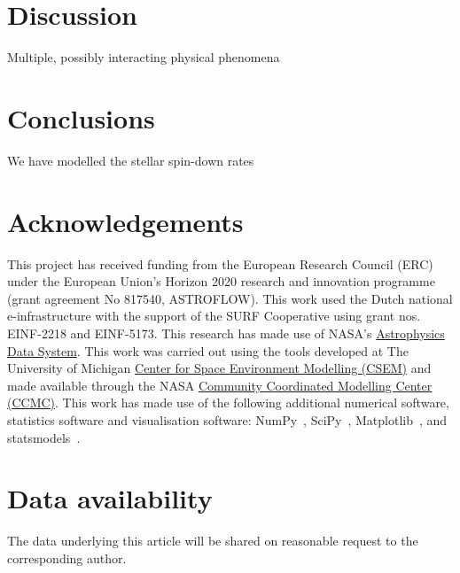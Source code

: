 %
%
\section{Discussion}\label{sec:Discussion}

Multiple, possibly interacting physical phenomena

%
%
\section{Conclusions}\label{sec:Conclusions}
We have modelled the stellar spin-down rates

\section*{Acknowledgements}

    This project has received funding from the European Research Council (ERC) under the European Union's Horizon 2020 research and innovation programme (grant agreement No 817540, ASTROFLOW).
    This work used the Dutch national e-infrastructure with the support of the SURF Cooperative using grant nos. EINF-2218 and EINF-5173.
    This research has made use of NASA's \href{https://ui.adsabs.harvard.edu/}{Astrophysics Data System}.
    This work was carried out using the \swmf{} tools developed at The University of Michigan \href{https://spaceweather.engin.umich.edu/the-center-for-space-environment-modelling-csem/}{Center for Space Environment Modelling (CSEM)} and made available through the NASA \href{https://ccmc.gsfc.nasa.gov/}{Community Coordinated Modelling Center (CCMC)}.
    This work has made use of the following additional numerical software, statistics software and visualisation software:
          NumPy~\citep{2011CSE....13b..22V},
          SciPy~\citep{2020SciPy-NMeth},
     Matplotlib~\citep{2007CSE.....9...90H},
     and
    statsmodels~\citep{seabold2010statsmodels}.

\section*{Data availability}
The data underlying this article will be shared on reasonable request to the corresponding author.

